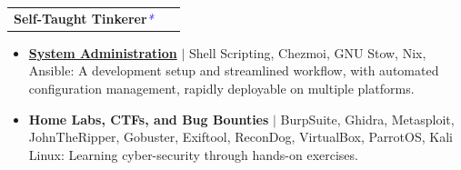 \documentclass[letterpaper,11pt]{article}
\makeatletter
\newcommand{\resumeItem}[1]{
  \item\small{
    {#1 \vspace{-0.5pt}}
  }
}
\newcommand{\resumeProjectHeading}[2]{
    \item
    \begin{tabular*}{1.001\textwidth}{l@{\extracolsep{\fill}}r}
      \small#1 & \textbf{\small #2}\\
    \end{tabular*}\vspace{-7pt}
}
\newcommand{\resumeItemListStart}{\begin{itemize}}
\newcommand{\resumeItemListEnd}{\end{itemize}\vspace{-5pt}}
\makeatother
\begin{document}
        \resumeProjectHeading
            {\textbf{\large{Self-Taught Tinkerer}}\textcolor{blue}{\small{\textit{*}}}}
            {~}
            \vspace{-11pt}
            \resumeItemListStart 
                \resumeItem{\normalsize{\href{https://github.com/saharshbhansali/.nix-dots}{\textbf{System Administration}} \href{https://github.com/saharshbhansali/.nix-dots}{\footnotesize{\raisebox{-0.1\height}\faExternalLink}} $|$ Shell Scripting, Chezmoi, GNU Stow, Nix, Ansible: A development setup and streamlined workflow, with automated configuration management, rapidly deployable on multiple platforms.}} \vspace{-11pt}
                \resumeItem{\normalsize{\textbf{Home Labs, CTFs, and Bug Bounties} $|$ BurpSuite, Ghidra, Metasploit, JohnTheRipper, Gobuster, Exiftool, ReconDog, VirtualBox, ParrotOS, Kali Linux: Learning cyber-security through hands-on exercises.}} \vspace{-11pt}
            \resumeItemListEnd
            \vspace{-7.5pt}

\end{document}
